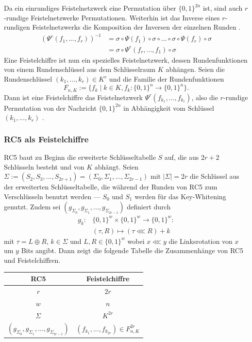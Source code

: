 \documentclass[course=erap]{aspdoc}
\begin{document}
Da ein einrundiges Feistelnetzwerk eine Permutation über $\{0,1\}^{2n}$ ist, sind auch $r$-rundige Feistelnetzwerke Permutationen. Weiterhin ist das Inverse eines $r$-rundigen Feistelnetzwerks die Komposition der Inversen der einzelnen Runden \cite[p.13]{nachef}.
\begin{align*}
    (\Psi^r(f_1, ..., f_r))^{-1} &= \sigma \circ \Psi(f_1) \circ \sigma \circ ... \circ \sigma \circ \Psi(f_r) \circ \sigma \\
                                 &= \sigma \circ \Psi^r(f_r, ..., f_1) \circ \sigma
\end{align*} Eine Feistelchiffre ist nun ein spezielles Feistelnetzwerk, dessen Rundenfunktionen von einem Rundenschlüssel aus dem Schlüsselraum $K$ abhängen.
Seien die Rundenschlüssel $(k_1, ..., k_r) \in K^r$ und die Familie der Rundenfunktionen
\[
    F_{n, K} := \{f_k \mid k \in K, f_k \colon \{0, 1\}^n \to \{0, 1\}^n\}.
\]
Dann ist eine Feistelchiffre das Feistelnetzwerk $\Psi^r(f_{k_1},...,f_{k_r})$, also die $r$-rundige Permutation von der Nachricht $\{0, 1\}^{2n}$ in Abhängigkeit vom Schlüssel $(k_1, ..., k_r)$ \cite[p.14]{nachef}.

\subsubsection{RC5 als Feistelchiffre}

RC5 baut zu Beginn die erweiterte Schlüsseltabelle $S$ auf, die aus $2r + 2$ Schlüsseln besteht und von $K$ abhängt. Seien $\Sigma := (S_2, S_3, ..., S_{2r+1}) = (\Sigma_0, \Sigma_1, ..., \Sigma_{2r-1})$ mit $|\Sigma| = 2r$ die Schlüssel aus der erweiterten Schlüsseltabelle, die während der Runden von RC5 zum Verschlüsseln benutzt werden --- $S_0$ und $S_1$ werden für das Key-Whitening genutzt. Zudem sei $(g_{\Sigma_0}, g_{\Sigma_1}, ..., g_{\Sigma_{2r-1}})$ definiert durch
\begin{align*}
    g_k \colon &\{0, 1\}^w \times \{0, 1\}^w \to \{0, 1\}^w \colon \\
               &(\tau, R) \mapsto (\tau \lll R) + k
\end{align*}
mit $\tau = L \oplus R$, $k \in \Sigma$ und $L, R \in \{0, 1\}^w$ wobei $x \lll y$ die Linksrotation von $x$ um $y$ Bits angibt. Dann zeigt die folgende Tabelle die Zusammenhänge von RC5 und Feistelchiffren.

\begin{center}
 \begin{tabular}{c|c}
 RC5 & Feistelchiffre \\
 \hline
 $r$ & $2r$ \\
 $w$ & $n$ \\
 $\Sigma$ & $K^{2r}$ \\
 $(g_{\Sigma_0}, g_{\Sigma_1}, ..., g_{\Sigma_{2r-1}})$ & $(f_{k_1}, ..., f_{k_{2r}}) \in F^{2r}_{n, K}$ \\
\end{tabular}
\end{center}
\end{document}
